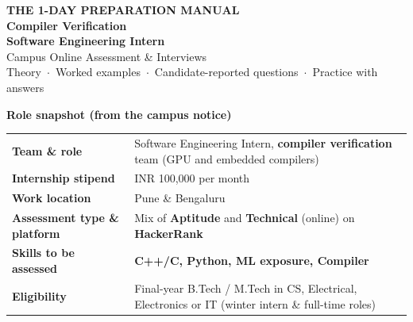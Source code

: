 \documentclass[10pt,a4paper,openany,oneside]{report}
\begin{document}
\begin{titlepage}
\thispagestyle{empty}
\vspace*{0.6cm}
\begin{tcolorbox}[enhanced,colback=nvdark,colframe=nvdark,sharp corners,left=16pt,right=16pt,top=18pt,bottom=18pt]
{\color{nvgreen}\bfseries\large THE 1-DAY PREPARATION MANUAL}\\[8pt]
{\color{white}\bfseries\fontsize{31}{36}\selectfont Compiler Verification\\Software Engineering Intern}\\[10pt]
{\color{white}\Large Campus Online Assessment \& Interviews}\\[4pt]
{\color{white!85!black}\normalsize Theory \,$\cdot$\, Worked examples \,$\cdot$\, Candidate-reported questions \,$\cdot$\, Practice with answers}
\end{tcolorbox}

\vspace{0.5cm}
{\large\bfseries\color{nvdark} Role snapshot (from the campus notice)}\par\smallskip
\begin{xltabular}{\textwidth}{@{}>{\bfseries}L{4.4cm}Y@{}}
\toprule
Team \& role & Software Engineering Intern, \textbf{compiler verification} team (GPU and embedded compilers)\\
Internship stipend & INR 100,000 per month\\
Work location & Pune \& Bengaluru\\
Assessment type \& platform & Mix of \textbf{Aptitude} and \textbf{Technical} (online) on \textbf{HackerRank}\\
Skills to be assessed & \textbf{C++/C, Python, ML exposure, Compiler}\\
Eligibility & Final-year B.Tech / M.Tech in CS, Electrical, Electronics or IT (winter intern \& full-time roles)\\
\bottomrule
\end{xltabular}


\end{titlepage}
\end{document}
